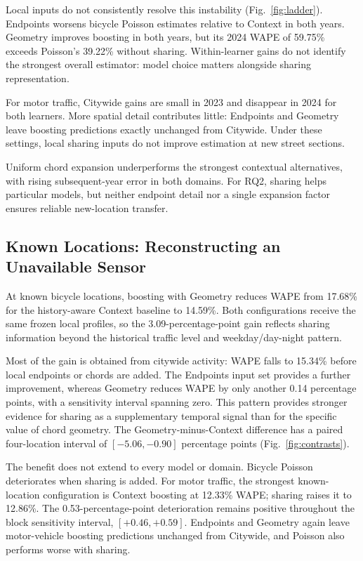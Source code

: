 \documentclass[]{interact}
\begin{document}
Local inputs do not consistently resolve this instability (Fig.~\ref{fig:ladder}). Endpoints worsens bicycle Poisson estimates relative to Context in both years. Geometry improves boosting in both years, but its 2024 WAPE of 59.75\% exceeds Poisson's 39.22\% without sharing. Within-learner gains do not identify the strongest overall estimator: model choice matters alongside sharing representation.

For motor traffic, Citywide gains are small in 2023 and disappear in 2024 for both learners. More spatial detail contributes little: Endpoints and Geometry leave boosting predictions exactly unchanged from Citywide. Under these settings, local sharing inputs do not improve estimation at new street sections.

Uniform chord expansion underperforms the strongest contextual alternatives, with rising subsequent-year error in both domains. For RQ2, sharing helps particular models, but neither endpoint detail nor a single expansion factor ensures reliable new-location transfer.

\subsection{Known Locations: Reconstructing an Unavailable Sensor}
At known bicycle locations, boosting with Geometry reduces WAPE from 17.68\% for the history-aware Context baseline to 14.59\%. Both configurations receive the same frozen local profiles, so the 3.09-percentage-point gain reflects sharing information beyond the historical traffic level and weekday/day-night pattern.

Most of the gain is obtained from citywide activity: WAPE falls to 15.34\% before local endpoints or chords are added. The Endpoints input set provides a further improvement, whereas Geometry reduces WAPE by only another 0.14 percentage points, with a sensitivity interval spanning zero. This pattern provides stronger evidence for sharing as a supplementary temporal signal than for the specific value of chord geometry. The Geometry-minus-Context difference has a paired four-location interval of $[-5.06,-0.90]$ percentage points (Fig.~\ref{fig:contrasts}).

The benefit does not extend to every model or domain. Bicycle Poisson deteriorates when sharing is added. For motor traffic, the strongest known-location configuration is Context boosting at 12.33\% WAPE; sharing raises it to 12.86\%. The 0.53-percentage-point deterioration remains positive throughout the block sensitivity interval, $[+0.46,+0.59]$. Endpoints and Geometry again leave motor-vehicle boosting predictions unchanged from Citywide, and Poisson also performs worse with sharing.
\end{document}
